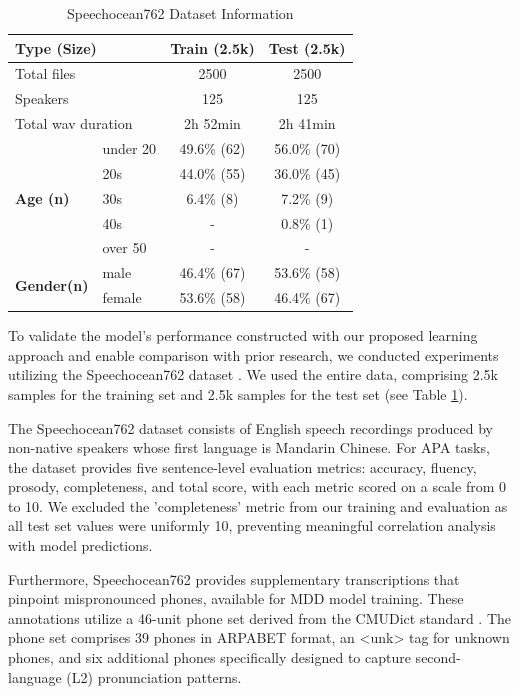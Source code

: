 \documentclass[sigconf,nonacm]{acmart}
\begin{document}
\begin{table}[t]
\centering
\caption{Speechocean762 Dataset Information}
\label{tab:speechocean762_data}
\begin{tabular}{llcc}
\toprule
\multicolumn{2}{l}{\textbf{Type (Size)}} & \textbf{Train (2.5k)} & \textbf{Test (2.5k)} \\
\midrule
\multicolumn{2}{l}{Total files} & 2500 & 2500 \\
\multicolumn{2}{l}{Speakers} & 125 & 125 \\
\multicolumn{2}{l}{Total wav duration} & 2h 52min & 2h 41min \\
\midrule
\multirow{5}{*}{\textbf{Age (n)}} & under 20 & 49.6\% (62) & 56.0\% (70) \\
& 20s & 44.0\% (55) & 36.0\% (45) \\
& 30s & 6.4\% (8) & 7.2\% (9) \\
& 40s & - & 0.8\% (1) \\
& over 50 & - & - \\
\midrule
\multirow{2}{*}{\textbf{Gender(n)}} & male & 46.4\% (67) & 53.6\% (58) \\
& female & 53.6\% (58) & 46.4\% (67) \\
\bottomrule
\end{tabular}
\end{table}

To validate the model's performance constructed with our proposed learning approach and enable comparison with prior research, we conducted experiments utilizing the Speechocean762 dataset \cite{zhang2021speechocean762}. We used the entire data, comprising 2.5k samples for the training set and 2.5k samples for the test set (see Table \ref{tab:speechocean762_data}).

The Speechocean762 dataset consists of English speech recordings produced by non-native speakers whose first language is Mandarin Chinese. For APA tasks, the dataset provides five sentence-level evaluation metrics: accuracy, fluency, prosody, completeness, and total score, with each metric scored on a scale from 0 to 10. We excluded the 'completeness' metric from our training and evaluation as all test set values were uniformly 10, preventing meaningful correlation analysis with model predictions.

Furthermore, Speechocean762 provides supplementary transcriptions that pinpoint mispronounced phones, available for MDD model training. These annotations utilize a 46-unit phone set derived from the CMUDict standard \cite{weide1998carnegie}. The phone set comprises 39 phones in ARPABET format, an <unk> tag for unknown phones, and six additional phones specifically designed to capture second-language (L2) pronunciation patterns.
\end{document}
